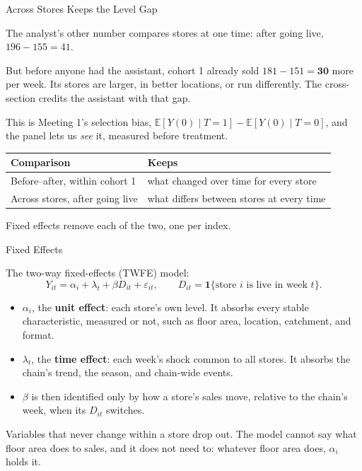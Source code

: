 \documentclass[aspectratio=169, 11pt, handout]{beamer}
\newcommand{\E}{\mathbb{E}}
\newcommand{\ind}[1]{\mathbf{1}\{#1\}}
\begin{document}
\begin{frame}{Across Stores Keeps the Level Gap}

The analyst's other number compares stores at one time: after going live, $196 - 155 = 41$.

\bigskip

But before anyone had the assistant, cohort 1 already sold $181 - 151 = \textbf{30}$ more per week. Its stores are larger, in better locations, or run differently. The cross-section credits the assistant with that gap.

\bigskip

This is Meeting 1's selection bias, $\E[Y(0) \mid T=1] - \E[Y(0) \mid T=0]$, and the panel lets us \emph{see} it, measured before treatment.

\bigskip

\begin{center}
\begin{tabular}{ll}
\toprule
\textbf{Comparison} & \textbf{Keeps} \\
\midrule
Before--after, within cohort 1 & what changed over time for every store \\
Across stores, after going live & what differs between stores at every time \\
\bottomrule
\end{tabular}
\end{center}

\medskip

Fixed effects remove each of the two, one per index.
\end{frame}

\begin{frame}{Fixed Effects}

The two-way fixed-effects (TWFE) model:
\[
Y_{it} = \alpha_i + \lambda_t + \beta D_{it} + \varepsilon_{it}, \qquad D_{it} = \ind{\text{store } i \text{ is live in week } t}.
\]

\begin{itemize}
  \item $\alpha_i$, the \textbf{unit effect}: each store's own level. It absorbs every stable characteristic, measured or not, such as floor area, location, catchment, and format.
  \item $\lambda_t$, the \textbf{time effect}: each week's shock common to all stores. It absorbs the chain's trend, the season, and chain-wide events.
  \item $\beta$ is then identified only by how a store's sales move, relative to the chain's week, when its $D_{it}$ switches.
\end{itemize}

\medskip

Variables that never change within a store drop out. The model cannot say what floor area does to sales, and it does not need to: whatever floor area does, $\alpha_i$ holds it.
\end{frame}
\end{document}
